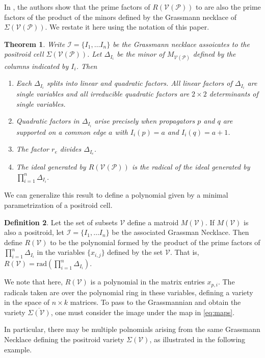 \documentclass[11pt]{article}
\newcommand{\cP}{\mathcal{P}}
\newcommand{\cV}{\mathcal{V}}
\newcommand{\VP}{\cV(\cP)}
\newcommand{\cI}{\mathcal{I}}
\newtheorem{thm}{Theorem}[section]
\theoremstyle{remark}
\theoremstyle{definition}
\newtheorem{dfn}[thm]{Definition}
\begin{document}
In \cite{GWLDCII}, the authors show that the prime factors of $R(\VP)$ to are also the prime factors of the product of the minors defined by the Grassmann necklace of $\Sigma(\VP)$. We restate it here using the notation of this paper.

\begin{thm} \cite[Proposition 5.3]{GWLDCII} \label{res:prop alg gives rad}
Write $\cI = \{I_1, \ldots I_n\}$ be the Grassmann necklace assoicates to the positroid cell $\Sigma(\VP)$. Let $\Delta_{I_i}$ be the minor of $M_{\VP}$ defined by the columns indicated by $I_i$. Then
  \begin{enumerate}
   \item Each $\Delta_{I_i}$ splits into linear and quadratic factors.  All linear factors of  $\Delta_{I_i}$ are single variables and all irreducible quadratic factors are $2\times 2$ determinants of single variables.
    \item Quadratic factors in $\Delta_{I_i}$ arise precisely when propagators $p$ and $q$ are supported on a common edge $a$ with $I_i(p)=a$ and $I_i(q)=a+1$.
    \item The factor $r_e$ divides $\Delta_{I_e}$.
    \item The ideal generated by $R(\VP)$ is the radical of the ideal generated by $\prod_{i=1}^{n}\Delta_{I_i}$.
  \end{enumerate}
\end{thm}

We can generalize this result to define a polynomial given by a minimal parametrization of a positroid cell. 

\begin{dfn}\label{dfn:RV}
Let the set of subsets $\cV$ define a matroid $M(\cV)$. If $M(\cV)$ is also a positroid, let $\cI =  \{I_1, \ldots I_n\}$ be the associated Grassman Necklace. Then define $R(\cV)$ to be the polynomial formed by the product of the prime factors of $\prod_{i=1}^{n}\Delta_{I_i}$ in the variables $\{x_{i,j}\}$ defined by the set $\cV$. That is, $R(\cV) = \textrm{rad}(\prod_{i=1}^{n}\Delta_{I_i})$. 
\end{dfn}

We note that here, $R(\cV)$ is a polynomial in the matrix entries $x_{p,i}$. The radicals taken are over the polynomial ring in these variables, defining a variety in the space of $n \times k$ matrices. To pass to the Grassmannian and obtain the variety $\overline{\Sigma(\cV)}$, one must consider the image under the map in \eqref{eq:maps}. 

In particular, there may be multiple polnomials arising from the same Grassmann Necklace defining the positroid variety $\Sigma(\cV)$, as illustrated in the following example.
\end{document}
